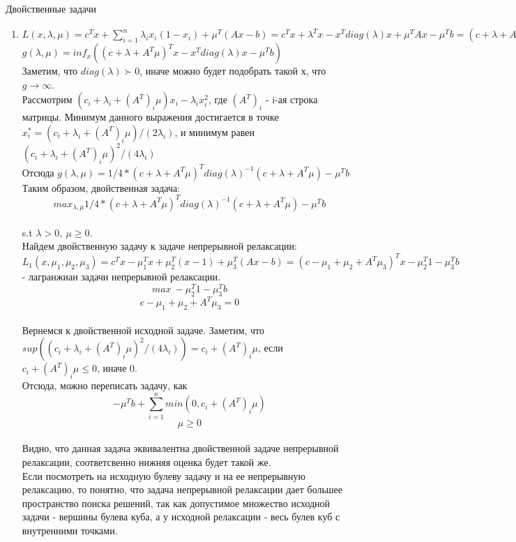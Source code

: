 \documentclass[12pt]{extreport}
\theoremstyle{definiton}
\theoremstyle{definition}
\theoremstyle{definition}
\let\leq\leqslant
\let\geq\geqslant
\begin{document}
    \PR[] Двойственные задачи
    \begin{enumerate}
    \item $L(x, \lambda, \mu) = c^Tx + \sum_{i=1}^n\lambda_ix_i(1-x_i)+\mu^T(Ax-b)=c^Tx+\lambda^Tx-x^Tdiag(\lambda)x+\mu^T Ax-\mu^T b=(c+\lambda+ A^T\mu)^Tx-x^Tdiag(\lambda)x-\mu^T b$
    \\ $g(\lambda, \mu) = inf_x((c+\lambda+ A^T\mu)^Tx-x^Tdiag(\lambda)x-\mu^T b)$
    \\ Заметим, что $diag(\lambda) \succ 0$, иначе можно будет подобрать такой х, что $g \to \infty$.
    \\ Рассмотрим $(c_i + \lambda_i+(A^T)_i\mu)x_i-\lambda_ix_i^2$, где $(A^T)_i$ - i-ая строка матрицы. Минимум данного выражения достигается в точке $x_i^*=(c_i + \lambda_i+(A^T)_i\mu)/(2\lambda_i)$, и минимум равен $(c_i + \lambda_i+(A^T)_i\mu)^2/(4\lambda_i)$
    \\ Отсюда $g(\lambda, \mu)=1/4 *(c+\lambda+ A^T\mu)^Tdiag(\lambda)^{-1}(c+\lambda+ A^T\mu)-\mu^Tb$
    \\ Таким образом, двойственная задача:
    \\ $$max_{\lambda, \mu} 1/4 *(c+\lambda+ A^T\mu)^Tdiag(\lambda)^{-1}(c+\lambda+ A^T\mu)-\mu^Tb$$\\ s.t $\lambda > 0,\ \mu \geq 0$.
    \\ Найдем двойственную задачу к задаче непрерывной релаксации:
    \\ $L_1(x,\mu_1, \mu_2, \mu_3) = c^Tx - \mu_1^Tx+\mu_2^T(x-1)+\mu_3^T(Ax-b) = (c-\mu_1+\mu_2+A^T\mu_3)^Tx-\mu_2^T1-\mu_3^Tb$ - лагранжиан задачи непрерывной релаксации.
    \\ $$max\ -\mu_2^T1-\mu_3^Tb$$ $$c-\mu_1+\mu_2+A^T\mu_3 = 0$$
    \\ Вернемся к двойственной исходной задаче. Заметим, что $sup((c_i + \lambda_i+(A^T)_i\mu)^2/(4\lambda_i)) = c_i+(A^T)_i\mu$, если $c_i+(A^T)_i\mu \leq 0$, иначе 0.
    \\ Отсюда, можно переписать задачу, как $$-\mu^Tb+\sum_{i=1}^n min(0, c_i+(A^T)_i\mu)$$ $$\mu \geq 0$$
    \\ Видно, что данная задача эквивалентна двойственной задаче непрерывной релаксации, соответсвенно нижняя оценка будет такой же.
    \newline
    \\ Если посмотреть на исходную булеву задачу и на ее непрерывную релаксацию, то понятно, что задача непрерывной релаксации дает большее пространство поиска решений, так как допустимое множество исходной задачи - вершины булева куба, а у исходной релаксации - весь булев куб с внутренними точками. 

\end{enumerate}
\end{document}

